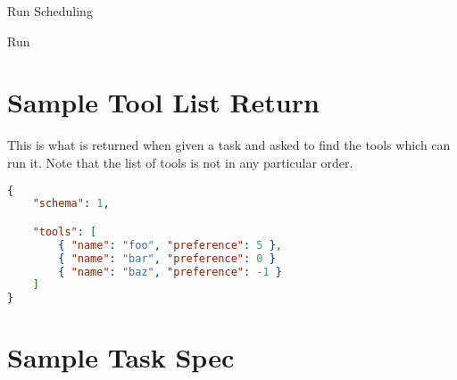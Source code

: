 \documentclass[10pt]{article}
\begin{document}
%
%
\begin{msc}{Run Scheduling}
\parts






\end{msc}



%
%
\begin{msc}{Run}
\parts


\nextlevel[3]






\end{msc}



\section{Sample Tool List Return}

This is what is returned when given a task and asked to find the tools
which can run it.  Note that the list of tools is not in any
particular order.

\begin{lstlisting}[language=json,firstnumber=1]
{
    "schema": 1,

    "tools": [
        { "name": "foo", "preference": 5 },
        { "name": "bar", "preference": 0 }
        { "name": "baz", "preference": -1 }
    ]
}
\end{lstlisting}




\section{Sample Task Spec}
\end{document}
